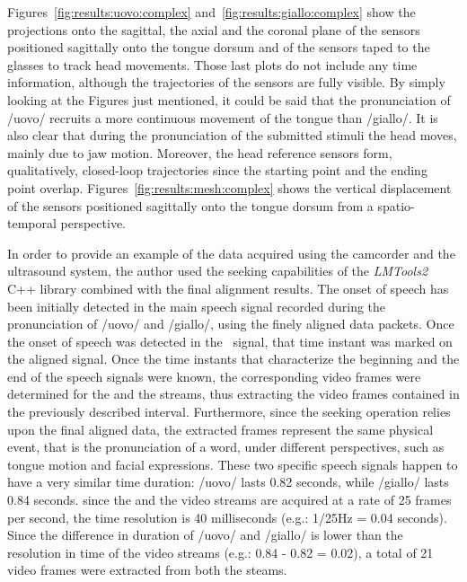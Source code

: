 


%
%
Figures~\ref{fig:results:uovo:complex}
and~\ref{fig:results:giallo:complex} show the projections onto the sagittal, 
the axial and the coronal plane of the sensors positioned sagittally onto the 
tongue dorsum and of the sensors taped to the glasses to track head movements.
Those last plots do not include any time information, although the
trajectories of the sensors are fully visible.
By simply looking at the Figures just mentioned, it could be said that the
pronunciation of /uovo/ recruits a more continuous movement of the tongue than
/giallo/. 
It is also clear that during the pronunciation of the submitted stimuli the head
moves, mainly due to jaw motion. 
Moreover, the head reference sensors form, qualitatively, closed-loop
trajectories since the starting point and the ending point overlap. 
Figures~\ref{fig:results:mesh:complex} shows the vertical displacement of the
sensors positioned sagittally onto the tongue dorsum from a spatio-temporal 
perspective.



In order to provide an example of the data acquired using the camcorder and the
ultrasound system, the author used the seeking capabilities of the 
\emph{LMTools2} C++ library combined with the final alignment results.
The onset of speech has been initially detected in the  main 
speech signal recorded during the pronunciation of /uovo/ and /giallo/, using
the finely aligned data packets.
%
%
Once the onset of speech was detected in the~ signal, that
time instant was marked on the aligned  signal.
Once the time instants that characterize the beginning and the end of the
speech signals were known,  the corresponding video
frames were determined for
the  and the  streams, thus
extracting  the video frames contained in the previously described interval.
Furthermore, since the seeking operation relies upon the final aligned data,
the extracted frames represent the same physical event, that is the
pronunciation of a word, under different perspectives, such as tongue motion and
facial expressions.
These two specific speech signals happen
to have a very similar time duration: /uovo/
lasts 0.82 seconds, while /giallo/ lasts 0.84 seconds.
since the  and the  video streams are acquired at a rate 
of 25 frames per second, the time resolution is 40 milliseconds (e.g.: 1/25Hz =
0.04 seconds).
Since the difference in duration of /uovo/ and /giallo/ is lower than the 
resolution in time of the video streams (e.g.: 0.84 - 0.82 = 0.02), a
total of 21 video frames were extracted from both the steams.

